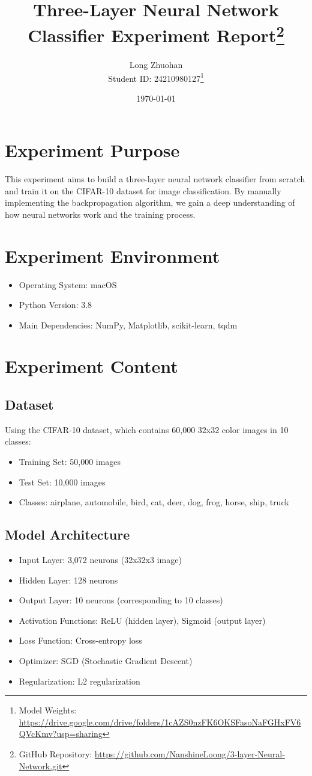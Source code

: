 \documentclass[12pt]{article}
\title{Three-Layer Neural Network Classifier Experiment Report\footnote{GitHub Repository: \url{https://github.com/NanshineLoong/3-layer-Neural-Network.git}}}
\author{Long Zhuohan \\ Student ID: 24210980127\footnote{Model Weights: \url{https://drive.google.com/drive/folders/1cAZS0nzFK6OKSFasoNaFGHxFV6QVcKmv?usp=sharing}}}
\date{\today}
\begin{document}
\maketitle

\section{Experiment Purpose}
This experiment aims to build a three-layer neural network classifier from scratch and train it on the CIFAR-10 dataset for image classification. By manually implementing the backpropagation algorithm, we gain a deep understanding of how neural networks work and the training process.

\section{Experiment Environment}
\begin{itemize}
    \item Operating System: macOS
    \item Python Version: 3.8
    \item Main Dependencies: NumPy, Matplotlib, scikit-learn, tqdm
\end{itemize}

\section{Experiment Content}

\subsection{Dataset}
Using the CIFAR-10 dataset, which contains 60,000 32x32 color images in 10 classes:
\begin{itemize}
    \item Training Set: 50,000 images
    \item Test Set: 10,000 images
    \item Classes: airplane, automobile, bird, cat, deer, dog, frog, horse, ship, truck
\end{itemize}

\subsection{Model Architecture}
\begin{itemize}
    \item Input Layer: 3,072 neurons (32x32x3 image)
    \item Hidden Layer: 128 neurons
    \item Output Layer: 10 neurons (corresponding to 10 classes)
    \item Activation Functions: ReLU (hidden layer), Sigmoid (output layer)
    \item Loss Function: Cross-entropy loss
    \item Optimizer: SGD (Stochastic Gradient Descent)
    \item Regularization: L2 regularization
\end{itemize}
\end{document}
